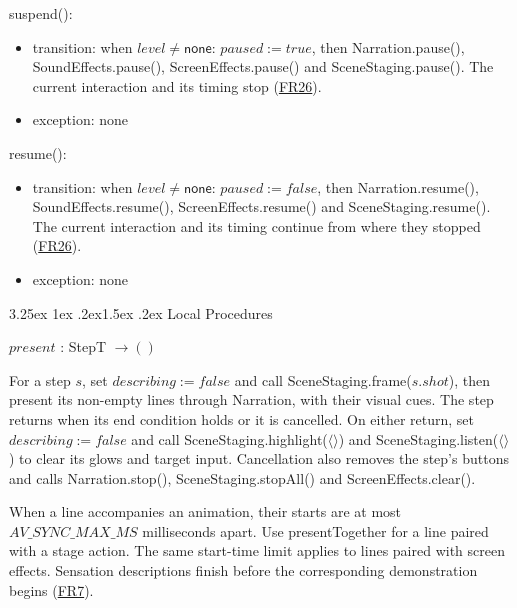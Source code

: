 \documentclass[10pt, titlepage]{article}
\makeatletter
\newcommand{\srsurl}{https://team-hindsight.github.io/ophthamology-game/SRS/SRS.pdf}
\newcommand{\srsitemref}[2]{\href{\srsurl\#nameddest=#1}{#2}}
\renewcommand\paragraph{\@startsection{paragraph}{4}{\z@}%
  {3.25ex \@plus 1ex \@minus .2ex}{1.5ex \@plus .2ex}%
  {\normalfont\normalsize\bfseries}}
\newcommand{\T}[1]{\mathit{#1}}          %
\newcommand{\V}[1]{\mathsf{#1}}          %
\newcommand{\true}{\mathit{true}}
\newcommand{\false}{\mathit{false}}
\makeatother
\begin{document}
\begin{samepage}
\noindent suspend():
\begin{itemize}
\item transition: when $\T{level} \neq \V{none}$: $\T{paused} := \true$,
  then Narration.pause(), SoundEffects.pause(), ScreenEffects.pause() and
  SceneStaging.pause(). The current interaction and its timing stop
  (\srsitemref{FR_Suspend}{FR26}).
\item exception: none
\end{itemize}
\end{samepage}
\par\pagebreak[0]

\begin{samepage}
\noindent resume():
\begin{itemize}
\item transition: when $\T{level} \neq \V{none}$: $\T{paused} := \false$,
  then Narration.resume(), SoundEffects.resume(), ScreenEffects.resume() and
  SceneStaging.resume(). The current interaction and its timing continue
  from where they stopped (\srsitemref{FR_Suspend}{FR26}).
\item exception: none
\end{itemize}
\end{samepage}
\par\pagebreak[0]

\paragraph{Local Procedures}

$\T{present}$ : StepT $\to ()$

For a step $s$, set $\T{describing} := \false$ and call
SceneStaging.frame($s.\T{shot}$), then present its
non-empty lines through Narration, with their visual cues. The step returns
when its end condition holds or it is cancelled. On either return, set
$\T{describing} := \false$ and call
SceneStaging.highlight($\langle\rangle$) and
SceneStaging.listen($\langle\rangle$) to clear its glows and target input.
Cancellation also removes the step's buttons and calls Narration.stop(),
SceneStaging.stopAll() and ScreenEffects.clear().

When a line accompanies an animation, their starts are at most
$\T{AV\_SYNC\_MAX\_MS}$ milliseconds apart. Use presentTogether for a
line paired with a stage action. The same start-time limit applies to
lines paired with screen effects. Sensation descriptions finish before
the corresponding demonstration begins (\srsitemref{FR_DescribeSensations}{FR7}).
\end{document}

